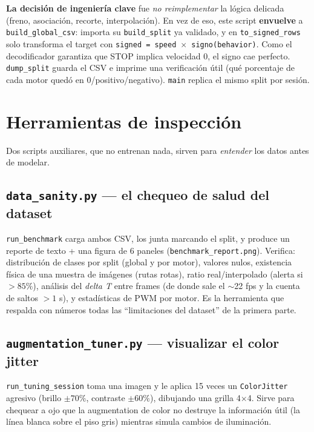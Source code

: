 \documentclass[11pt,a4paper]{article}
\newcommand{\code}[1]{\lstinline[basicstyle=\ttfamily\normalsize]|#1|}
\begin{document}


\textbf{La decisión de ingeniería clave} fue \emph{no reimplementar} la lógica delicada (freno, asociación,
recorte, interpolación). En vez de eso, este script \textbf{envuelve} a \code{build_global_csv}: importa su
\code{build_split} ya validado, y en \code{to_signed_rows} solo transforma el target con
\texttt{signed = speed}~$\times$~\texttt{signo(behavior)}. Como el decodificador garantiza que STOP implica velocidad 0, el
signo cae perfecto. \code{dump_split} guarda el CSV e imprime una verificación útil (qué porcentaje de cada
motor quedó en 0/positivo/negativo). \code{main} replica el mismo split por sesión.

\section{Herramientas de inspección}
Dos scripts auxiliares, que no entrenan nada, sirven para \emph{entender} los datos antes de modelar.

\subsection{\texttt{data\_sanity.py} --- el chequeo de salud del dataset}


\code{run_benchmark} carga ambos CSV, los junta marcando el split, y produce un reporte de texto + una figura
de 6 paneles (\code{benchmark_report.png}). Verifica: distribución de clases por split (global y por motor),
valores nulos, existencia física de una muestra de imágenes (rutas rotas), ratio real/interpolado (alerta si
$>85\%$), análisis del \emph{delta T} entre frames (de donde sale el $\sim$22 fps y la cuenta de saltos $>1$ s),
y estadísticas de PWM por motor. Es la herramienta que respalda con números todas las ``limitaciones del
dataset'' de la primera parte.

\subsection{\texttt{augmentation\_tuner.py} --- visualizar el color jitter}


\code{run_tuning_session} toma una imagen y le aplica 15 veces un \code{ColorJitter} agresivo (brillo $\pm70\%$,
contraste $\pm60\%$), dibujando una grilla 4$\times$4. Sirve para chequear a ojo que la augmentation de color
no destruye la información útil (la línea blanca sobre el piso gris) mientras simula cambios de iluminación.
\end{document}
